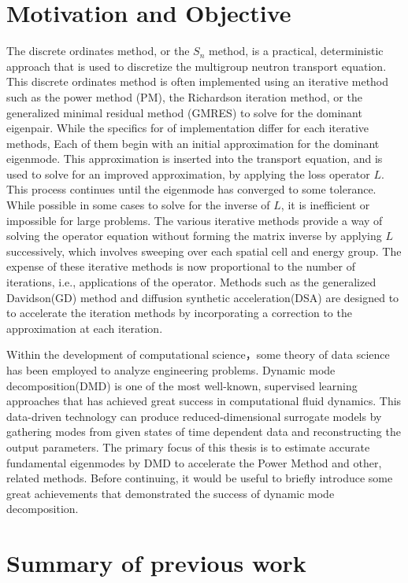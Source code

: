 \section{Motivation and Objective}
The discrete ordinates method, or the $S_n$ method, is a practical, deterministic approach that is used to discretize the  multigroup neutron transport equation.
This discrete ordinates method is often implemented using an iterative method such as the power method (PM), the Richardson iteration method\cite{adams1993two}, or the generalized minimal residual method (GMRES)\cite{saad1986gmres} to solve for the dominant eigenpair. 
While the specifics for of implementation differ for each iterative methods, Each of them begin with an initial approximation for the dominant eigenmode.
This approximation is inserted into the transport equation, and is used to solve for an improved approximation, by applying the loss operator $L$.
This process continues until the eigenmode has converged to some tolerance.
While possible in some cases to solve for the inverse of $L$, it is inefficient or impossible for large problems.
The various iterative methods provide a way of solving the operator equation without forming the matrix inverse by applying $L$ successively, which involves sweeping over each spatial cell and energy group.  
The expense of these iterative methods is now proportional to the number of iterations, i.e., applications of the operator.
Methods such as the generalized Davidson(GD) method\cite{larsen1984diffusion} and diffusion synthetic acceleration(DSA)\cite{hamilton2011numerical} are designed to to accelerate the iteration methods by incorporating a correction to the approximation at each iteration.

Within the development of computational science，some theory of data science has been employed to analyze engineering problems.
Dynamic mode decomposition(DMD) is one of the most well-known, supervised learning approaches that has achieved great success in computational fluid dynamics.
This data-driven technology can produce reduced-dimensional surrogate models by gathering modes from given states of time dependent data and reconstructing the output parameters.
The primary focus of this thesis is to estimate accurate fundamental eigenmodes by DMD to accelerate the Power Method and other, related methods.
Before continuing, it would be useful to briefly introduce some great achievements that demonstrated the success of dynamic mode decomposition.

\section{Summary of previous work}

